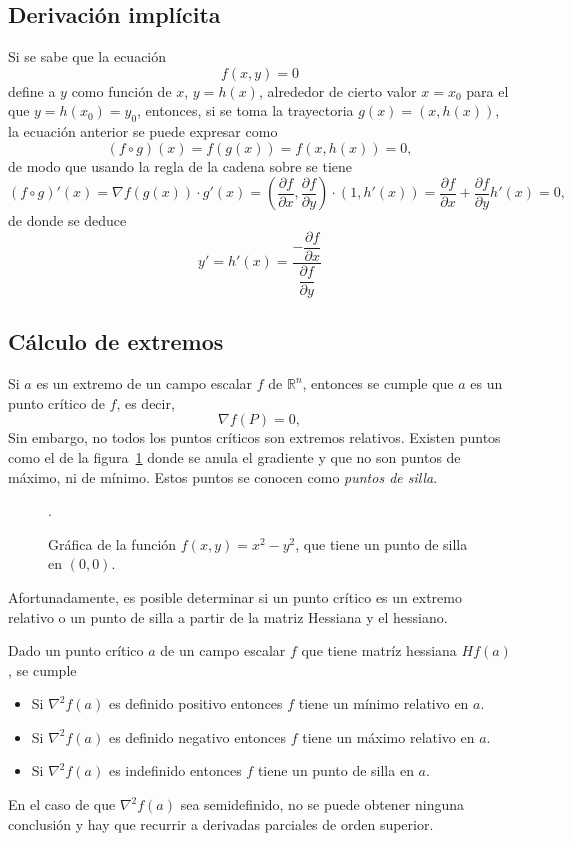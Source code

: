 \subsection{Derivación implícita}
Si se sabe que la ecuación 
\[
f(x,y)=0
\]
define a $y$ como función de $x$, $y=h(x)$, alrededor de cierto valor $x=x_0$ para el que $y=h(x_0)=y_0$, entonces, si se toma la trayectoria $g(x)=(x,h(x))$, la ecuación anterior se puede expresar como
\[
(f\circ g)(x) = f(g(x)) = f(x,h(x))=0,
\]
de modo que usando la regla de la cadena sobre se tiene
\[
(f\circ g)'(x) = \nabla f(g(x))\cdot g'(x) = \left(\frac{\partial f}{\partial x}, \frac{\partial f}{\partial y}\right)\cdot (1,h'(x)) = 
\frac{\partial f}{\partial x}+\frac{\partial f}{\partial y}h'(x) = 0,
\] 
de donde se deduce
\[
y'=h'(x)=\frac{-\dfrac{\partial f}{\partial x}}{\dfrac{\partial f}{\partial y}}
\]

\subsection{Cálculo de extremos}
Si $a$ es un extremo de un campo escalar $f$ de $\mathbb{R}^n$, entonces se cumple que $a$ es un punto crítico de $f$,
es decir,
\[
\nabla f(P) = 0,
\]
Sin embargo, no todos los puntos críticos son extremos relativos. 
Existen puntos como el de la figura~\ref{g:punto_silla} donde se anula el gradiente y que no son puntos de máximo, ni de
mínimo.
Estos puntos se conocen como \emph{puntos de silla}. 
\begin{figure}[htp]
\begin{center}
\scalebox{1}{}.
\caption{Gráfica de la función $f(x,y)=x^2-y^2$, que tiene un punto de silla en $(0,0)$. }
\label{g:punto_silla}
\end{center}
\end{figure}

Afortunadamente, es posible determinar si un punto crítico es un extremo relativo o un punto de silla a partir de la
matriz Hessiana y el hessiano. 

\begin{teorema}
Dado un punto crítico $a$ de un campo escalar $f$ que tiene matríz hessiana $Hf(a)$, se cumple
\begin{itemize}
\item Si $\nabla^2f(a)$ es definido positivo entonces $f$ tiene un mínimo relativo en $a$.
\item Si $\nabla^2f(a)$ es definido negativo entonces $f$ tiene un máximo relativo en $a$.
\item Si $\nabla^2f(a)$ es indefinido entonces $f$ tiene un punto de silla en $a$.
\end{itemize}
\end{teorema}
En el caso de que $\nabla^2f(a)$ sea semidefinido, no se puede obtener ninguna conclusión y hay que recurrir a derivadas
parciales de orden superior.

